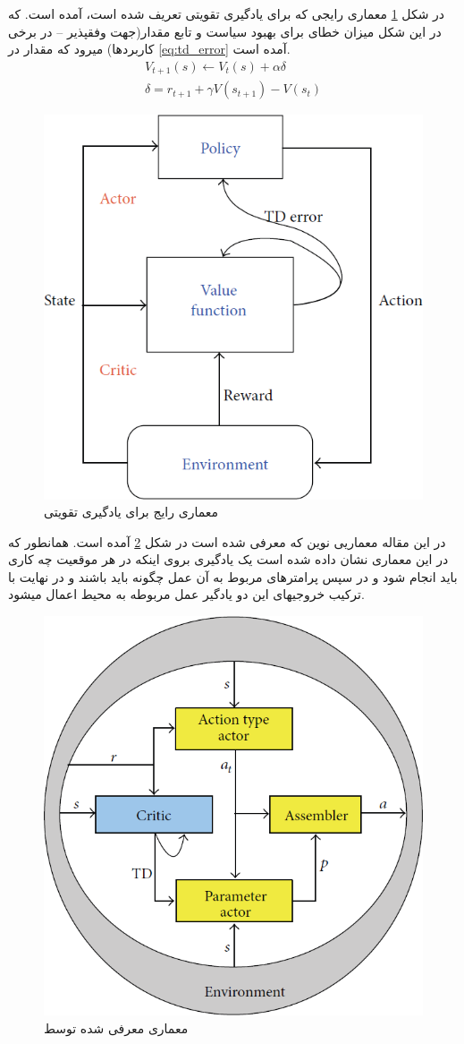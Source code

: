 \documentclass[10pt,a4paper]{article}
\newcommand{\نیمفاصله}{\halfspace}
\renewcommand{\ }{\halfspace}
\newcommand{\مق}{\lr}
\newcommand{\قم}{یادگیری تقویتی }
\newcommand{\ز}{\footnote{\lr{}}}
\begin{document}
در شکل
\ref{fig:common_arch}
معماری رایجی که برای \قم تعریف شده است، آمده است. که در این شکل میزان خطای \مق{TD Error} برای بهبود سیاست و تابع مقدار(جهت وفق\ پذیر -- در برخی کاربردها) می\ رود که مقدار \مق{TD Error} در
\ref{eq:td_error}
آمده است.
\begin{gather}
V_{t+1}(s) \leftarrow V_{t}(s) + \alpha \delta\\
\delta = r_{t + 1} + \gamma V(s_{t + 1}) - V(s_{t})\label{eq:td_error} 
\end{gather}
\begin{figure}
\centering
\includegraphics[width=.5\textwidth]{common_arch}
\caption{معماری رایج برای \قم}\label{fig:common_arch}
\end{figure}
در این مقاله معماریی نوین که معرفی شده است در شکل
\ref{fig:new_arch}
آمده است. همان\ طور که در این معماری نشان داده شده است یک یادگیری بروی اینکه در هر موقعیت چه کاری باید انجام شود و در سپس پرامترهای مربوط به آن عمل چگونه باید باشند و در نهایت با ترکیب خروجی\ های این دو یادگیر عمل مربوطه به محیط اعمال می\ شود.
\begin{figure}
\centering
\includegraphics[width=.5\textwidth]{new_arch}
\caption{معماری معرفی شده توسط}\label{fig:new_arch}
\end{figure}
\end{document}
